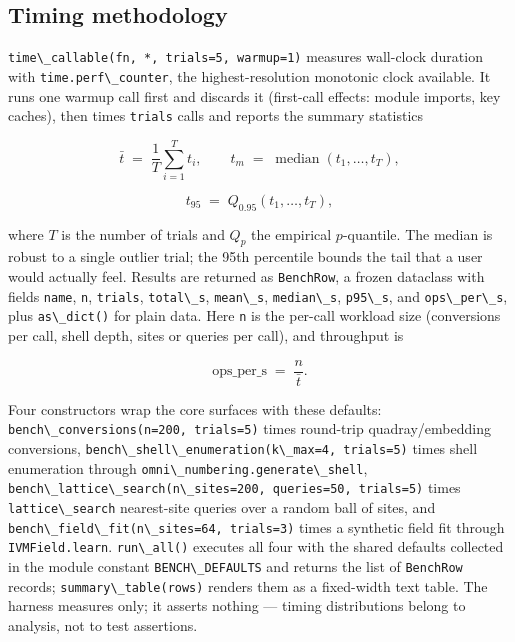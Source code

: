 \documentclass[
  10pt,
]{article}
\newcommand{\passthrough}[1]{#1}
\begin{document}
\subsection{Timing methodology}\label{timing-methodology}

\passthrough{\lstinline!time\_callable(fn, *, trials=5, warmup=1)!}
measures wall-clock duration with
\passthrough{\lstinline!time.perf\_counter!}, the highest-resolution
monotonic clock available. It runs one warmup call first and discards it
(first-call effects: module imports, key caches), then times
\passthrough{\lstinline!trials!} calls and reports the summary
statistics

\begin{equation}
\label{eq:bench-mean}
\bar{t} \;=\; \frac{1}{T}\sum_{i=1}^{T} t_i ,
\qquad t_m \;=\; \operatorname{median}(t_1,\dots,t_T),
\end{equation}

\begin{equation}
\label{eq:bench-percentile}
t_{95} \;=\; Q_{0.95}(t_1,\dots,t_T),
\end{equation}

where \(T\) is the number of trials and \(Q_p\) the empirical
\(p\)-quantile. The median is robust to a single outlier trial; the 95th
percentile bounds the tail that a user would actually feel. Results are
returned as \passthrough{\lstinline!BenchRow!}, a frozen dataclass with
fields \passthrough{\lstinline!name!}, \passthrough{\lstinline!n!},
\passthrough{\lstinline!trials!}, \passthrough{\lstinline!total\_s!},
\passthrough{\lstinline!mean\_s!}, \passthrough{\lstinline!median\_s!},
\passthrough{\lstinline!p95\_s!}, and
\passthrough{\lstinline!ops\_per\_s!}, plus
\passthrough{\lstinline!as\_dict()!} for plain data. Here
\passthrough{\lstinline!n!} is the per-call workload size (conversions
per call, shell depth, sites or queries per call), and throughput is

\begin{equation}
\label{eq:bench-ops}
\text{ops\_per\_s} \;=\; \frac{n}{\bar{t}} .
\end{equation}

Four constructors wrap the core surfaces with these defaults:
\passthrough{\lstinline!bench\_conversions(n=200, trials=5)!} times
round-trip quadray/embedding conversions,
\passthrough{\lstinline!bench\_shell\_enumeration(k\_max=4, trials=5)!}
times shell enumeration through
\passthrough{\lstinline!omni\_numbering.generate\_shell!},
\passthrough{\lstinline!bench\_lattice\_search(n\_sites=200, queries=50, trials=5)!}
times \passthrough{\lstinline!lattice\_search!} nearest-site queries
over a random ball of sites, and
\passthrough{\lstinline!bench\_field\_fit(n\_sites=64, trials=3)!} times
a synthetic field fit through \passthrough{\lstinline!IVMField.learn!}.
\passthrough{\lstinline!run\_all()!} executes all four with the shared
defaults collected in the module constant
\passthrough{\lstinline!BENCH\_DEFAULTS!} and returns the list of
\passthrough{\lstinline!BenchRow!} records;
\passthrough{\lstinline!summary\_table(rows)!} renders them as a
fixed-width text table. The harness measures only; it asserts nothing
--- timing distributions belong to analysis, not to test assertions.
\end{document}
